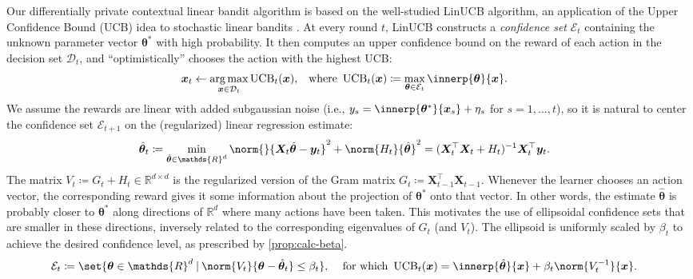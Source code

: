 \documentclass{article}
\renewcommand{\vec}[1]{\bm{#1}}
\newcommand{\defeq}{\coloneq}
\newcommand{\inv}[1]{#1^{-1}}
\newcommand{\Real}{\mathds{R}}
\newcommand{\UCB}{\operatorname{UCB}}
\DeclareMathOperator*{\argmax}{arg\,max}
\newcommand\given[1][\delimsize]{%
  \providecommand{\delimsize}{}
  \nonscript\:#1\vert\allowbreak\nonscript\:\mathopen{}
}
\newcommand{\E}{\mathcal{E}}
\providecommand\transp{\top}
\let\transpsymbol\transp
\renewcommand{\transp}[1]{#1^\transpsymbol}
\newcommand{\Dset}[1]{\mathcal{D}_{#1}}
\newcommand{\XtX}[1]{\transp{#1}{#1}}
\begin{document}
Our differentially private contextual linear bandit algorithm is based
on the well-studied LinUCB algorithm, an application of the Upper
Confidence Bound (UCB) idea to stochastic linear bandits
\citep{DaniStochasticLinearOptimization2008,RusmevichientongLinearlyParameterizedBandits2010,AbbasiYadkoriImprovedAlgorithmsLinear2011}.
At every round $t$, LinUCB constructs a \emph{confidence set} $\E_t$
containing the unknown parameter vector $\vec\theta^*$ with high
probability.  It then computes an upper confidence bound on the reward
of each action in the decision set $\Dset{t}$, and ``optimistically''
chooses the action with the highest UCB:
\begin{align}\label{eq:def-ucb}
  \vec x_t &\gets \argmax_{\vec x\in\Dset{t}} \UCB_t(\vec x),
  &\text{where }
  \UCB_t(\vec x) &\defeq \max_{\vec\theta\in\E_t} \innerp{\vec\theta}{\vec x}.
\end{align}
We assume the rewards are linear with added subgaussian noise (i.e.,
$y_s = \innerp{\vec\theta^*}{\vec x_s} + \eta_s$ for $s=1,\dotsc,t$), so it
is natural to center the confidence set $\E_{t+1}$ on the
(regularized) linear regression estimate:
\begin{align*}
  \hat{\vec\theta}_t &\defeq \min_{\hat{\vec\theta} \in \Real^d} \norm{}{\vec X_t \hat{\vec\theta} - \vec y_t}^2 + \norm{H_t}{\hat{\vec\theta}}^2
  = \inv{(\XtX{\vec X_t} + H_t)} \transp{\vec X_t} \vec y_t.
\end{align*}
The matrix $V_t \defeq G_t + H_t \in \Real^{d\times d}$ is the regularized
version of the Gram matrix $G_t \defeq \XtX{\vec X_{t-1}}$.  Whenever
the learner chooses an action vector, the corresponding reward gives
it some information about the projection of $\vec\theta^*$ onto that
vector.  In other words, the estimate $\hat{\vec\theta}$ is probably
closer to $\vec\theta^*$ along directions of $\Real^d$ where many
actions have been taken.  This motivates the use of ellipsoidal
confidence sets that are smaller in these directions, inversely
related to the corresponding eigenvalues of $G_t$ (and $V_t$). The
ellipsoid is uniformly scaled by $\beta_t$ to achieve the desired
confidence level, as prescribed by \cref{prop:calc-beta}.
\begin{align}\label{eq:def-ellip}
  \E_t &\defeq \set{\vec\theta\in\Real^d \given
        \norm{V_t}{\vec\theta-\hat{\vec\theta}_t} \le \beta_t},
  &\text{ for which }
    \UCB_t(\vec x) &= \innerp{\hat{\vec\theta}}{\vec x} + \beta_t\norm{\inv{V_t}}{\vec x}.
\end{align}
\end{document}
